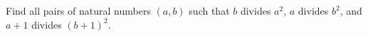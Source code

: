 \problem
Find all pairs of natural numbers $(a, b)$ such that $b$ divides $a^2$,
$a$ divides $b^2$, and $a + 1$ divides $(b + 1)^2$.
\solution
\endproblem
